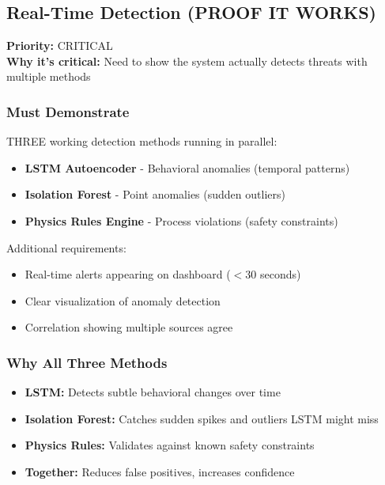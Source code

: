 \documentclass[11pt,a4paper]{article}
\begin{document}
\subsection{Real-Time Detection (PROOF IT WORKS)}

\textbf{Priority:} \textcolor{critical}{CRITICAL} \\
\textbf{Why it's critical:} Need to show the system actually detects threats with multiple methods

\subsubsection{Must Demonstrate}

THREE working detection methods running in parallel:

\begin{itemize}[leftmargin=*]
    \item \textbf{LSTM Autoencoder} - Behavioral anomalies (temporal patterns)
    \item \textbf{Isolation Forest} - Point anomalies (sudden outliers)
    \item \textbf{Physics Rules Engine} - Process violations (safety constraints)
\end{itemize}

Additional requirements:
\begin{itemize}[leftmargin=*]
    \item Real-time alerts appearing on dashboard ($<$30 seconds)
    \item Clear visualization of anomaly detection
    \item Correlation showing multiple sources agree
\end{itemize}

\subsubsection{Why All Three Methods}

\begin{itemize}[leftmargin=*]
    \item \textbf{LSTM:} Detects subtle behavioral changes over time
    \item \textbf{Isolation Forest:} Catches sudden spikes and outliers LSTM might miss
    \item \textbf{Physics Rules:} Validates against known safety constraints
    \item \textbf{Together:} Reduces false positives, increases confidence
\end{itemize}
\end{document}
